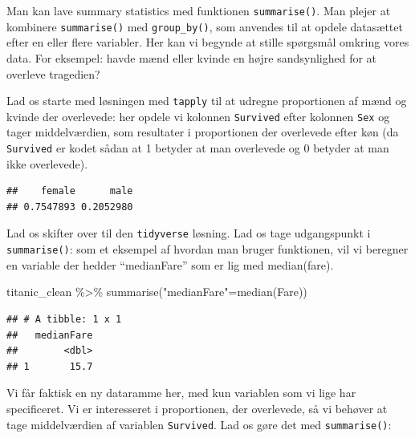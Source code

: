 \documentclass[
]{book}
\newenvironment{Shaded}{\begin{snugshade}}{\end{snugshade}}
\newcommand{\CommentTok}[1]{\textcolor[rgb]{0.56,0.35,0.01}{\textit{#1}}}
\newcommand{\FunctionTok}[1]{\textcolor[rgb]{0.00,0.00,0.00}{#1}}
\newcommand{\NormalTok}[1]{#1}
\newcommand{\OtherTok}[1]{\textcolor[rgb]{0.56,0.35,0.01}{#1}}
\newcommand{\SpecialCharTok}[1]{\textcolor[rgb]{0.00,0.00,0.00}{#1}}
\newcommand{\StringTok}[1]{\textcolor[rgb]{0.31,0.60,0.02}{#1}}
\begin{document}
Man kan lave summary statistics med funktionen \texttt{summarise()}. Man plejer at kombinere \texttt{summarise()} med \texttt{group\_by()}, som anvendes til at opdele datasættet efter en eller flere variabler. Her kan vi begynde at stille spørgsmål omkring vores data. For eksempel: havde mænd eller kvinde en højre sandsynlighed for at overleve tragedien?

Lad os starte med løsningen med \texttt{tapply} til at udregne proportionen af mænd og kvinde der overlevede: her opdele vi kolonnen \texttt{Survived} efter kolonnen \texttt{Sex} og tager middelværdien, som resultater i proportionen der overlevede efter køn (da \texttt{Survived} er kodet sådan at 1 betyder at man overlevede og 0 betyder at man ikke overlevede).

\begin{Shaded}
\end{Shaded}

\begin{verbatim}
##    female      male 
## 0.7547893 0.2052980
\end{verbatim}

Lad os skifter over til den \texttt{tidyverse} løsning. Lad os tage udgangspunkt i \texttt{summarise()}: som et eksempel af hvordan man bruger funktionen, vil vi beregner en variable der hedder ``medianFare'' som er lig med median(fare).

\begin{Shaded}
\begin{Highlighting}[]
\NormalTok{titanic\_clean }\SpecialCharTok{\%\textgreater{}\%}
  \FunctionTok{summarise}\NormalTok{(}\StringTok{"medianFare"}\OtherTok{=}\FunctionTok{median}\NormalTok{(Fare))}
\end{Highlighting}
\end{Shaded}

\begin{verbatim}
## # A tibble: 1 x 1
##   medianFare
##        <dbl>
## 1       15.7
\end{verbatim}

Vi får faktisk en ny dataramme her, med kun variablen som vi lige har specificeret. Vi er interesseret i proportionen, der overlevede, så vi behøver at tage middelværdien af variablen \texttt{Survived}. Lad os gøre det med \texttt{summarise()}:
\end{document}
